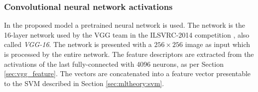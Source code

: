 
\subsubsection{Convolutional neural network activations}
\label{sec:meth:featextr:cnn}

In the proposed model a pretrained neural network is used. The network is the 16-layer network used by the VGG team in the ILSVRC-2014 competition \cite{simonyan2014very}, also called \emph{VGG-16}. The network is presented with a $256\times256$ image as input which is processed by the entire network. The feature descriptors are extracted from the activations of the last fully-connected with 4096 neurons, as per Section \ref{sec:vgg_feature}. The vectors are concatenated into a feature vector presentable to the SVM described in Section \ref{sec:mltheory:svm}. 
